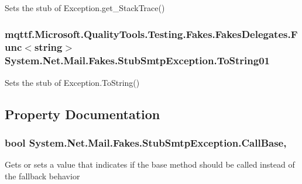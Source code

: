 Sets the stub of Exception.\-get\-\_\-\-Stack\-Trace()

\hypertarget{class_system_1_1_net_1_1_mail_1_1_fakes_1_1_stub_smtp_exception_a322cb348a31fa3986a2b765e7edb1ead}{
\subsubsection[{To\-String01}]{\setlength{\rightskip}{0pt plus 5cm}mqttf.\-Microsoft.\-Quality\-Tools.\-Testing.\-Fakes.\-Fakes\-Delegates.\-Func$<$string$>$ System.\-Net.\-Mail.\-Fakes.\-Stub\-Smtp\-Exception.\-To\-String01}}\label{class_system_1_1_net_1_1_mail_1_1_fakes_1_1_stub_smtp_exception_a322cb348a31fa3986a2b765e7edb1ead}


Sets the stub of Exception.\-To\-String()



\subsection{Property Documentation}
\hypertarget{class_system_1_1_net_1_1_mail_1_1_fakes_1_1_stub_smtp_exception_aae2782c8b628bfeaf0bccfbe2abdf921}{
\subsubsection[{Call\-Base}]{\setlength{\rightskip}{0pt plus 5cm}bool System.\-Net.\-Mail.\-Fakes.\-Stub\-Smtp\-Exception.\-Call\-Base\hspace{0.3cm}{\ttfamily [get]}, {\ttfamily [set]}}}\label{class_system_1_1_net_1_1_mail_1_1_fakes_1_1_stub_smtp_exception_aae2782c8b628bfeaf0bccfbe2abdf921}


Gets or sets a value that indicates if the base method should be called instead of the fallback behavior

